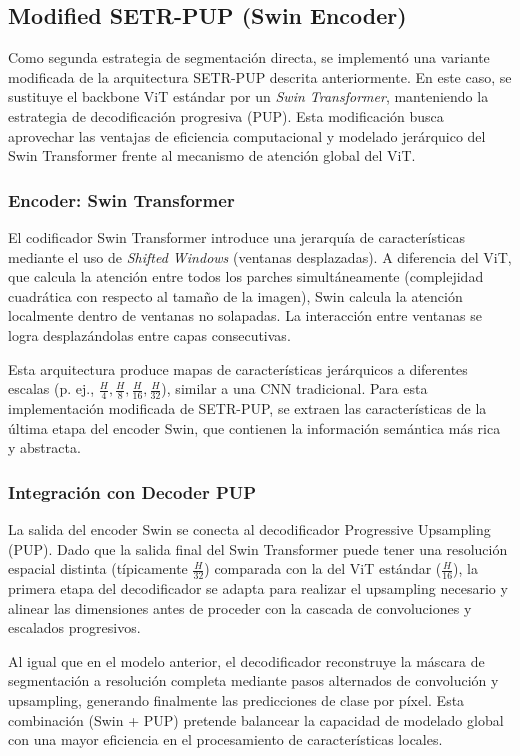 \documentclass[onecolumn, 12pt , journal]{IEEEtran}
\begin{document}
\subsection{Modified SETR-PUP (Swin Encoder)}

Como segunda estrategia de segmentación directa, se implementó una variante modificada de la arquitectura SETR-PUP descrita anteriormente. En este caso, se sustituye el backbone ViT estándar por un \emph{Swin Transformer}, manteniendo la estrategia de decodificación progresiva (PUP). Esta modificación busca aprovechar las ventajas de eficiencia computacional y modelado jerárquico del Swin Transformer frente al mecanismo de atención global del ViT.

\subsubsection{Encoder: Swin Transformer}

El codificador Swin Transformer introduce una jerarquía de características mediante el uso de \emph{Shifted Windows} (ventanas desplazadas). A diferencia del ViT, que calcula la atención entre todos los parches simultáneamente (complejidad cuadrática con respecto al tamaño de la imagen), Swin calcula la atención localmente dentro de ventanas no solapadas. La interacción entre ventanas se logra desplazándolas entre capas consecutivas.

Esta arquitectura produce mapas de características jerárquicos a diferentes escalas (p. ej., $\frac{H}{4}, \frac{H}{8}, \frac{H}{16}, \frac{H}{32}$), similar a una CNN tradicional. Para esta implementación modificada de SETR-PUP, se extraen las características de la última etapa del encoder Swin, que contienen la información semántica más rica y abstracta.

\subsubsection{Integración con Decoder PUP}

La salida del encoder Swin se conecta al decodificador Progressive Upsampling (PUP). Dado que la salida final del Swin Transformer puede tener una resolución espacial distinta (típicamente $\frac{H}{32}$) comparada con la del ViT estándar ($\frac{H}{16}$), la primera etapa del decodificador se adapta para realizar el upsampling necesario y alinear las dimensiones antes de proceder con la cascada de convoluciones y escalados progresivos.

Al igual que en el modelo anterior, el decodificador reconstruye la máscara de segmentación a resolución completa mediante pasos alternados de convolución y upsampling, generando finalmente las predicciones de clase por píxel. Esta combinación (Swin + PUP) pretende balancear la capacidad de modelado global con una mayor eficiencia en el procesamiento de características locales.
\end{document}
